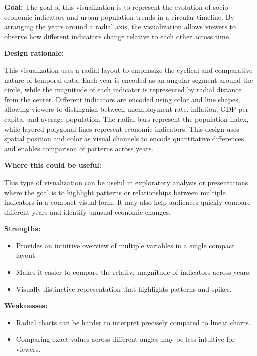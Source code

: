 \documentclass[11pt,a4paper]{article}
\begin{document}
\textbf{Goal:}  
The goal of this visualization is to represent the evolution of socio-economic indicators and urban population trends in a circular timeline. By arranging the years around a radial axis, the visualization allows viewers to observe how different indicators change relative to each other across time.

\textbf{Design rationale:}

This visualization uses a radial layout to emphasize the cyclical and comparative nature of temporal data. Each year is encoded as an angular segment around the circle, while the magnitude of each indicator is represented by radial distance from the center. Different indicators are encoded using color and line shapes, allowing viewers to distinguish between unemployment rate, inflation, GDP per capita, and average population. The radial bars represent the population index, while layered polygonal lines represent economic indicators. This design uses spatial position and color as visual channels to encode quantitative differences and enables comparison of patterns across years.

\textbf{Where this could be useful:}

This type of visualization can be useful in exploratory analysis or presentations where the goal is to highlight patterns or relationships between multiple indicators in a compact visual form. It may also help audiences quickly compare different years and identify unusual economic changes.

\textbf{Strengths:}
\begin{itemize}[leftmargin=1.5em]
    \item Provides an intuitive overview of multiple variables in a single compact layout.
    \item Makes it easier to compare the relative magnitude of indicators across years.
    \item Visually distinctive representation that highlights patterns and spikes.
\end{itemize}

\textbf{Weaknesses:}
\begin{itemize}[leftmargin=1.5em]
    \item Radial charts can be harder to interpret precisely compared to linear charts.
    \item Comparing exact values across different angles may be less intuitive for viewers.
\end{itemize}

\end{document}
